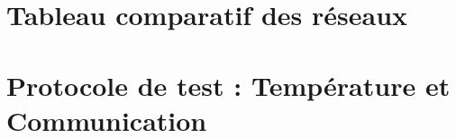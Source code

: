 \appendix

\chapter{Tableau comparatif des réseaux}
\label{ap:table_network}




\chapter{Protocole de test : Température et Communication }
\label{ap:teeeest}


